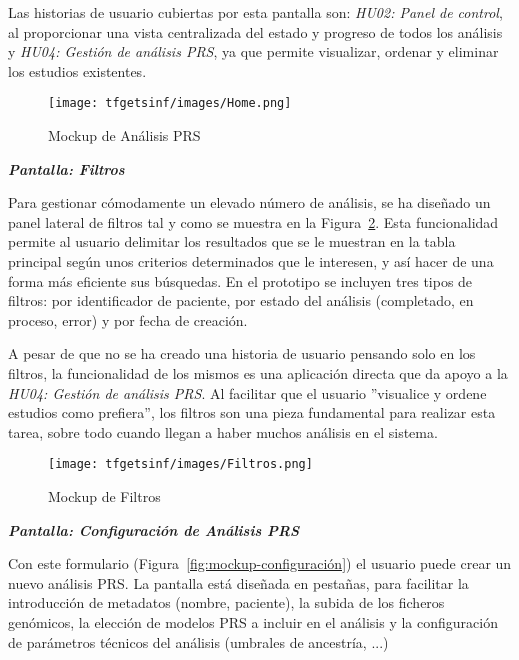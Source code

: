 Las historias de usuario cubiertas por esta pantalla son: \textit{HU02: Panel de control}, al proporcionar una vista centralizada del estado y progreso de todos los análisis y \textit{HU04: Gestión de análisis PRS}, ya que permite visualizar, ordenar y eliminar los estudios existentes.


\begin{figure}[H]
    \centering
    \texttt{[image: tfgetsinf/images/Home.png]}
    \caption{Mockup de Análisis PRS}
    \label{fig:mockup-home}
\end{figure}

\vspace{0.8em}
\noindent\textbf{\textit{Pantalla: Filtros}}
\vspace{0.8em}

Para gestionar cómodamente un elevado número de análisis, se ha diseñado un panel lateral de filtros tal y como se muestra en la Figura~\ref{fig:mockup-filtros}. Esta funcionalidad permite al usuario delimitar los resultados que se le muestran en la tabla principal según unos criterios determinados que le interesen, y así hacer de una forma más eficiente sus búsquedas. En el prototipo se incluyen tres tipos de filtros: por identificador de paciente, por estado del análisis (completado, en proceso, error) y por fecha de creación.

A pesar de que no se ha creado una historia de usuario pensando solo en los filtros, la funcionalidad de los mismos es una aplicación directa que da apoyo a la \textit{HU04: Gestión de análisis PRS}. Al facilitar que el usuario ''visualice y ordene estudios como prefiera'', los filtros son una pieza fundamental para realizar esta tarea, sobre todo cuando llegan a haber muchos análisis en el sistema.

\begin{figure}[H]
    \centering
    \texttt{[image: tfgetsinf/images/Filtros.png]}
    \caption{Mockup de Filtros}
    \label{fig:mockup-filtros}
\end{figure}

\vspace{0.8em}
\noindent\textbf{\textit{Pantalla: Configuración de Análisis PRS}}
\vspace{0.8em}

Con este formulario (Figura~\ref{fig:mockup-configuración}) el usuario puede crear un nuevo análisis PRS. La pantalla está diseñada en pestañas, para facilitar la introducción de metadatos (nombre, paciente), la subida de los ficheros genómicos, la elección de modelos PRS a incluir en el análisis y la configuración de parámetros técnicos del análisis (umbrales de ancestría, ...)

